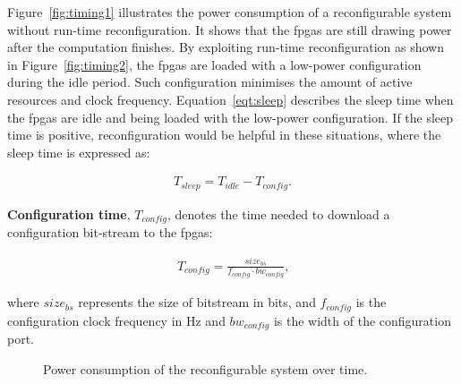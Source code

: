 Figure~\ref{fig:timing1} illustrates the power consumption of a reconfigurable system without run-time reconfiguration.
It shows that the \glspl{fpga} are still drawing power after the computation finishes.
By exploiting run-time reconfiguration as shown in Figure~\ref{fig:timing2}, the \glspl{fpga} are loaded with a low-power configuration during the idle period.
Such configuration minimises the amount of active resources and clock frequency.
Equation~\ref{eqt:sleep} describes the sleep time when the \glspl{fpga} are idle and being loaded with the low-power configuration.
If the sleep time is positive, reconfiguration would be helpful in these situations, where the sleep time is expressed as:

\begin{equation}
\begin{aligned}
T_{sleep} = T_{idle} - T_{config} \mbox{.}
\end{aligned}
\label{eqt:sleep}
\end{equation}

\textbf{Configuration time}, $T_{config}$, denotes the time needed to download a configuration bit-stream to the \glspl{fpga}:

\begin{equation}
\begin{aligned}
T_{config} = \frac{size_{bs}}{f_{config} \cdot bw_{config}} \mbox{,}
\end{aligned}
\label{eqt:cf}
\end{equation}

where $size_{bs}$ represents the size of bitstream in bits, and $f_{config}$ is the configuration clock frequency in Hz and $bw_{config}$ is the width of the configuration port.

\setcounter{subfigure}{0}
\begin{figure}[t!]
\centering
{}
\caption{Power consumption of the reconfigurable system over time.}
\label{fig:timing}
\end{figure}

